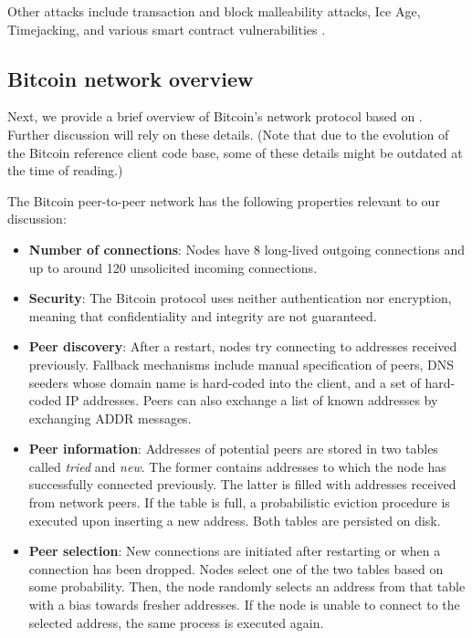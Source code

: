\documentclass[12pt]{article}
\begin{document}
Other attacks include transaction and block malleability attacks, Ice Age, Timejacking, and various smart contract vulnerabilities \cite{BitcoinWeaknesses}.


\subsection{Bitcoin network overview}

Next, we provide a brief overview of Bitcoin's network protocol based on \cite{Heilman2015EclipseAO, RoutingAttacks, BitcoinNetwork}. Further discussion will rely on these details. (Note that due to the evolution of the Bitcoin reference client code base, some of these details might be outdated at the time of reading.)

The Bitcoin peer-to-peer network has the following properties relevant to our discussion:

\begin{itemize}
    \item \textbf{Number of connections}: Nodes have 8 long-lived outgoing connections and up to around 120 unsolicited incoming connections.
    \item \textbf{Security}: The Bitcoin protocol uses neither authentication nor encryption, meaning that confidentiality and integrity are not guaranteed.
    \item \textbf{Peer discovery}: After a restart, nodes try connecting to addresses received previously. Fallback mechanisms include manual specification of peers, DNS seeders whose domain name is hard-coded into the client, and a set of hard-coded IP addresses. Peers can also exchange a list of known addresses by exchanging ADDR messages.
    \item \textbf{Peer information}: Addresses of potential peers are stored in two tables called \emph{tried} and \emph{new}. The former contains addresses to which the node has successfully connected previously. The latter is filled with addresses received from network peers. If the table is full, a probabilistic eviction procedure is executed upon inserting a new address. Both tables are persisted on disk.
    \item \textbf{Peer selection}: New connections are initiated after restarting or when a connection has been dropped. Nodes select one of the two tables based on some probability. Then, the node randomly selects an address from that table with a bias towards fresher addresses. If the node is unable to connect to the selected address, the same process is executed again.
\end{itemize}
\end{document}
